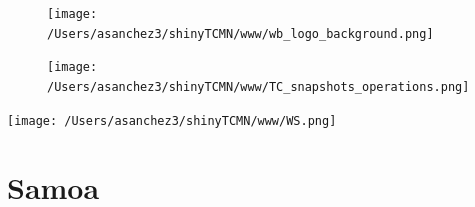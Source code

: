 \documentclass{article}\usepackage[]{graphicx}\usepackage[]{color}
\begin{document}
\newpage

\begin{figure}
  \vspace{-3ex} %
  \hspace{-7ex} %
  \texttt{[image: /Users/asanchez3/shinyTCMN/www/wb\_logo\_background.png]}
\end{figure}
\begin{figure}
  \begin{minipage}[t]{0.99\textwidth} %
      \vspace{-30ex}
      \hspace{-2ex}
      \raggedright{\texttt{[image: /Users/asanchez3/shinyTCMN/www/TC\_snapshots\_operations.png]}}
  \end{minipage}
\end{figure}
%
\begin{minipage}[t]{0.99\textwidth} %
  \vspace{-1.5cm}
  \begin{minipage}[c]{0.36\textwidth} 
    \begin{minipage}[c]{0.28\textwidth} %
      \texttt{[image: /Users/asanchez3/shinyTCMN/www/WS.png]}
    \end{minipage}
    \begin{minipage}[c]{0.70\textwidth} %
      \section*{\color{blue!40!black}Samoa}
    \end{minipage}
  \end{minipage}
  \begin{minipage}[c]{0.63\textwidth}
  \end{minipage}  
\end{minipage} %
\end{document}

